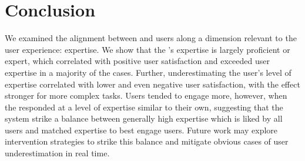 \section{Conclusion}
We examined the alignment between  and users along a dimension relevant to the user experience: expertise. We show that the 's expertise is largely proficient or expert, which correlated with positive user satisfaction and exceeded user expertise in a majority of the cases. Further, underestimating the user's level of expertise correlated with lower and even negative user satisfaction, with the effect stronger for more complex tasks. Users tended to engage more, however, when the  responded at a level of expertise similar to their own, suggesting that the system strike a balance between generally high expertise which is liked by all users and matched expertise to best engage users. Future work may explore intervention strategies to strike this balance and mitigate obvious cases of user underestimation in real time.
